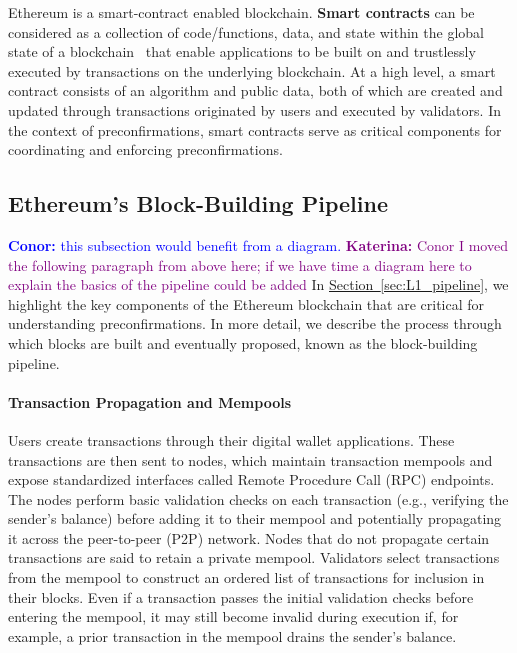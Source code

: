 \documentclass[a4paper]{article}
\theoremstyle{boldstyle}
\newcommand{\cm}[1]{\textcolor{blue}{\textbf{Conor:} #1}}
\newcommand{\ks}[1]{\textcolor{purple}{\textbf{Katerina:} #1}}
\begin{document}
    Ethereum is a smart-contract enabled blockchain. \textbf{Smart contracts} can be considered as a collection of code/functions, data, and state within the global state of a blockchain~\cite{W:IntroductionToSmartContracts} that enable applications to be built on and trustlessly executed by transactions on the underlying blockchain. At a high level, a smart contract consists of an algorithm and public data, both of which are created and updated through transactions originated by users and executed by validators. In the context of preconfirmations, smart contracts serve as critical components for coordinating and enforcing preconfirmations.
   
 
    \subsection{Ethereum's Block-Building Pipeline}
    \cm{this subsection would benefit from a diagram.}
    \label{sec:L1_pipeline}
 \ks{ Conor I moved the following paragraph from above here; if we have time a diagram here to explain the basics of the pipeline could be added} In \hyperref[sec:L1_pipeline]{Section~\ref{sec:L1_pipeline}}, we highlight the key components of the Ethereum blockchain that are critical for understanding preconfirmations. In more detail, we describe the process through which blocks are built and eventually proposed, known as the block-building pipeline. 
    
    \paragraph{Transaction Propagation and Mempools}
        Users create transactions through their digital wallet applications. These transactions are then sent to nodes, which maintain transaction mempools and expose standardized interfaces called Remote Procedure Call (RPC) endpoints. The nodes perform basic validation checks on each transaction (e.g., verifying the sender’s balance) before adding it to their mempool and potentially propagating it across the peer-to-peer (P2P) network. Nodes that do not propagate certain transactions are said to retain a private mempool. Validators select transactions from the mempool to construct an ordered list of transactions for inclusion in their blocks. Even if a transaction passes the initial validation checks before entering the mempool, it may still become invalid during execution if, for example, a prior transaction in the mempool drains the sender’s balance.  
        
\end{document}
